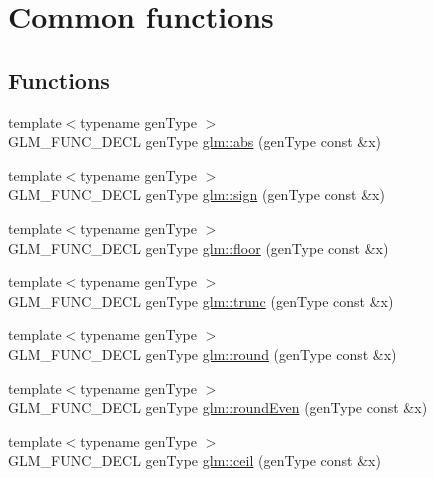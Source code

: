 \hypertarget{group__core__func__common}{\section{Common functions}
\label{group__core__func__common}
}
\subsection*{Functions}
\begin{DoxyCompactItemize}
\item 
{\footnotesize template$<$typename gen\-Type $>$ }\\G\-L\-M\-\_\-\-F\-U\-N\-C\-\_\-\-D\-E\-C\-L gen\-Type \hyperlink{group__core__func__common_gaea946f96ec1df259802effe9f532e1c1}{glm\-::abs} (gen\-Type const \&x)
\item 
{\footnotesize template$<$typename gen\-Type $>$ }\\G\-L\-M\-\_\-\-F\-U\-N\-C\-\_\-\-D\-E\-C\-L gen\-Type \hyperlink{group__core__func__common_gaa7afd59ab947e313d41cb6d9c655a80c}{glm\-::sign} (gen\-Type const \&x)
\item 
{\footnotesize template$<$typename gen\-Type $>$ }\\G\-L\-M\-\_\-\-F\-U\-N\-C\-\_\-\-D\-E\-C\-L gen\-Type \hyperlink{group__core__func__common_ga86350252cc9bf86421317460bbd1f21c}{glm\-::floor} (gen\-Type const \&x)
\item 
{\footnotesize template$<$typename gen\-Type $>$ }\\G\-L\-M\-\_\-\-F\-U\-N\-C\-\_\-\-D\-E\-C\-L gen\-Type \hyperlink{group__core__func__common_gadb091aed51e45872f6dc841affa41c5c}{glm\-::trunc} (gen\-Type const \&x)
\item 
{\footnotesize template$<$typename gen\-Type $>$ }\\G\-L\-M\-\_\-\-F\-U\-N\-C\-\_\-\-D\-E\-C\-L gen\-Type \hyperlink{group__core__func__common_ga75ebab3fe88a9c5c769135cf5a2649ef}{glm\-::round} (gen\-Type const \&x)
\item 
{\footnotesize template$<$typename gen\-Type $>$ }\\G\-L\-M\-\_\-\-F\-U\-N\-C\-\_\-\-D\-E\-C\-L gen\-Type \hyperlink{group__core__func__common_ga6535952553479a4bbca7f1f12a011b17}{glm\-::round\-Even} (gen\-Type const \&x)
\item 
{\footnotesize template$<$typename gen\-Type $>$ }\\G\-L\-M\-\_\-\-F\-U\-N\-C\-\_\-\-D\-E\-C\-L gen\-Type \hyperlink{group__core__func__common_gab81e02fff55c9391e28fa47e68c3c903}{glm\-::ceil} (gen\-Type const \&x)

\end{DoxyCompactItemize}
